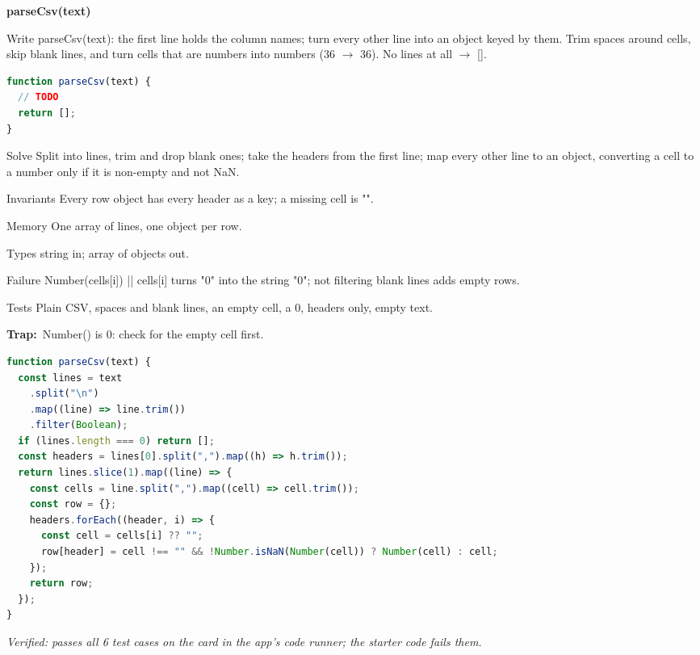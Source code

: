 \documentclass[10pt]{article}
\newcommand{\code}[1]{{\ttfamily\small #1}}
\newcommand{\trap}{\par\raggedright\textbf{\color{red!70!black}Trap:}~}
\newcommand{\cardsub}[1]{\par\medskip\noindent{\small\bfseries\scshape\color{black!70}#1}\par\nopagebreak\vspace{1pt}}
\begin{document}
\cardsub{The card}
\textbf{parseCsv(text)}\par
Write \code{parseCsv(text)}: the first line holds the column names; turn every other line into an object keyed by them. Trim spaces around cells, skip blank lines, and turn cells that are numbers into numbers (\code{\textquotedbl{}36\textquotedbl{}} $\rightarrow$ 36). No lines at all $\rightarrow$ \code{[]}.\par
\begin{lstlisting}[language=JavaScript]
function parseCsv(text) {
  // TODO
  return [];
}
\end{lstlisting}
\cardsub{How to solve it}
\begin{cardrows}
\item[Solve] Split into lines, trim and drop blank ones; take the headers from the first line; map every other line to an object, converting a cell to a number only if it is non-empty and not NaN.
\item[Invariants] Every row object has every header as a key; a missing cell is "".
\item[Memory] One array of lines, one object per row.
\item[Types] string in; array of objects out.
\item[Failure] \code{Number(cells[i]) || cells[i]} turns "0" into the string "0"; not filtering blank lines adds empty rows.
\item[Tests] Plain CSV, spaces and blank lines, an empty cell, a 0, headers only, empty text.
\end{cardrows}
\trap \code{Number(\textquotedbl{}\textquotedbl{})} is 0: check for the empty cell first.\par
\cardsub{Solution}
\begin{lstlisting}[language=JavaScript]
function parseCsv(text) {
  const lines = text
    .split("\n")
    .map((line) => line.trim())
    .filter(Boolean);
  if (lines.length === 0) return [];
  const headers = lines[0].split(",").map((h) => h.trim());
  return lines.slice(1).map((line) => {
    const cells = line.split(",").map((cell) => cell.trim());
    const row = {};
    headers.forEach((header, i) => {
      const cell = cells[i] ?? "";
      row[header] = cell !== "" && !Number.isNaN(Number(cell)) ? Number(cell) : cell;
    });
    return row;
  });
}
\end{lstlisting}
{\small \textit{Verified: passes all 6 test cases on the card in the app's code runner; the starter code fails them.}}\par
{}\par
\end{document}
